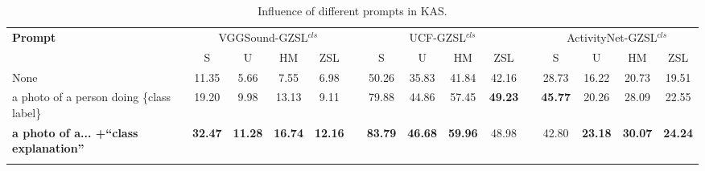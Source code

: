 \documentclass[lettersize,journal]{IEEEtran}
\begin{document}
\begin{table}[!t]
  \centering
  \caption{Influence of different prompts in KAS.}
  \label{tab:prompt}
  \begin{tabular}{l cccc c cccc c cccc}
    \toprule[2pt]
    \multirow{2}{*}{\textbf{Prompt}} 
    & \multicolumn{4}{c}{VGGSound-GZSL$^{\textit{cls}}$} & & \multicolumn{4}{c}{UCF-GZSL$^{\textit{cls}}$} & & \multicolumn{4}{c}{ActivityNet-GZSL$^{\textit{cls}}$} \\
    \cmidrule(lr){2-5} \cmidrule(lr){7-10} \cmidrule(lr){12-15}
    & S & U & HM & ZSL & & S & U & HM & ZSL & & S & U & HM & ZSL \\
    \midrule[1pt]
    None & 11.35 & 5.66 & 7.55 & 6.98 & & 50.26 & 35.83 & 41.84 & 42.16 & & 28.73 & 16.22 & 20.73 & 19.51 \\
    a photo of a person doing \{class label\} & 19.20 & 9.98 & 13.13 & 9.11 & & 79.88 & 44.86 & 57.45 & \textbf{49.23} & & \textbf{45.77} & 20.26 & 28.09 & 22.55 \\
    
    \noalign{\global\setlength{\oldaboverulesep}{\aboverulesep}}
    \noalign{\global\setlength{\oldbelowrulesep}{\belowrulesep}}
    \noalign{\global\setlength{\aboverulesep}{0pt}}
    \noalign{\global\setlength{\belowrulesep}{1.5pt}}
    \midrule[1pt]
    \rowcolor{gray!25}
    \textbf{a photo of a... +“class explanation”} & \textbf{32.47} & \textbf{11.28} & \textbf{16.74} & \textbf{12.16} & & \textbf{83.79} & \textbf{46.68} & \textbf{59.96} & 48.98 & & 42.80 & \textbf{23.18} & \textbf{30.07} & \textbf{24.24} \\
    \bottomrule[2pt]
    \noalign{\global\setlength{\aboverulesep}{\oldaboverulesep}}
    \noalign{\global\setlength{\belowrulesep}{\oldbelowrulesep}}
  \end{tabular}
\end{table}
\end{document}
